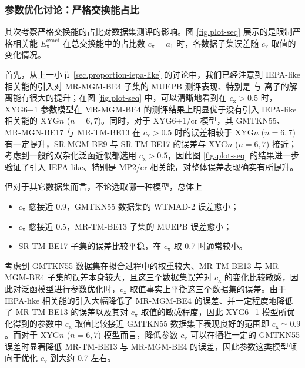 \subsubsection{参数优化讨论：严格交换能占比}
\label{sec.proportion-exchange}

其次考察严格交换能的占比对数据集测评的影响。图 \ref{fig.plot-seq} 展示的是限制严格相关能 $E_\mathrm{x}^\text{exact}$ 在总交换能中的占比数 $c_\mathrm{x} = a_1$ 时，各数据子集误差随 $c_\mathrm{x}$ 取值的变化情况。

首先，从上一小节 \ref{sec.proportion-iepa-like} 的讨论中，我们已经注意到 IEPA-like 相关能的引入对 MR-MGM-BE4 子集的 MUEPB 测评表现、特别是  与  离子的解离能有很大的提升；在图 \ref{fig.plot-seq} 中，可以清晰地看到在 $c_\mathrm{x} > 0.5$ 时，XYG6+1 参数模型在 MR-MGM-BE4 的测评结果上明显优于没有引入 IEPA-like 相关能的 XYG$n$ ($n=6,7$)。同时，对于 XYG6+1/cr 模型，其 GMTKN55、MR-MGN-BE17 与 MR-TM-BE13 在 $c_\mathrm{x} > 0.5$ 时的误差相较于 XYG$n$ ($n=6,7$) 有一定提升，SR-MGM-BE9 与 SR-TM-BE17 的误差与 XYG$n$ ($n=6,7$) 接近；考虑到一般的双杂化泛函近似都选用 $c_\mathrm{x} > 0.5$，因此图 \ref{fig.plot-seq} 的结果进一步验证了引入 IEPA-like、特别是 MP2/cr 相关能，对整体误差表现确实有所提升。

但对于其它数据集而言，不论选取哪一种模型，总体上
\begin{itemize}[nosep]
  \item $c_\mathrm{x}$ 愈接近 0.9，GMTKN55 数据集的 WTMAD-2 误差愈小；
  \item $c_\mathrm{x}$ 愈接近 0.5，MR-TM-BE13 子集的 MUEPB 误差愈小；
  \item SR-TM-BE17 子集的误差比较平稳，在 $c_\mathrm{x}$ 取 0.7 时通常较小。
\end{itemize}
考虑到 GMTKN55 数据集在拟合过程中的权重较大、MR-TM-BE13 与 MR-MGM-BE4 子集的误差本身较大，且这三个数据集误差对 $c_\mathrm{x}$ 的变化比较敏感，因此对泛函模型进行参数优化时，$c_\mathrm{x}$ 取值事实上平衡这三个数据集的误差。由于 IEPA-like 相关能的引入大幅降低了 MR-MGM-BE4 的误差、并一定程度地降低了 MR-TM-BE13 的误差以及其对 $c_\mathrm{x}$ 取值的敏感程度，因此 XYG6+1 模型所优化得到的参数中 $c_\mathrm{x}$ 取值比较接近 GMTKN55 数据集下表现良好的范围即 $c_\mathrm{x} \simeq 0.9$。而对于 XYG$n$ ($n=6,7$) 模型而言，降低参数 $c_\mathrm{x}$ 可以在牺牲一定的 GMTKN55 误差时显著降低 MR-TM-BE13 与 MR-MGM-BE4 的误差，因此参数这类模型倾向于优化 $c_\mathrm{x}$ 到大约 0.7 左右。

